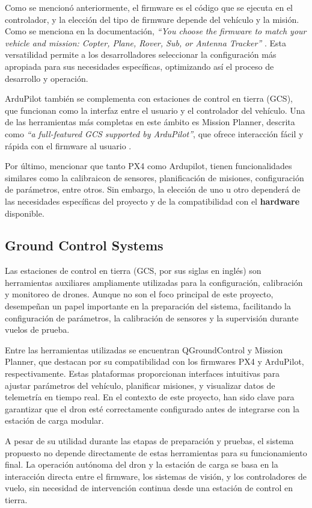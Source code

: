     Como se mencionó anteriormente, el firmware es el código que se ejecuta en el controlador, y la elección del tipo de firmware depende del vehículo y la misión. Como se menciona en la documentación, \textit{“You choose the firmware to match your vehicle and mission: Copter, Plane, Rover, Sub, or Antenna Tracker”} \cite{ardupilot_docs}. Esta versatilidad permite a los desarrolladores seleccionar la configuración más apropiada para sus necesidades específicas, optimizando así el proceso de desarrollo y operación.

    ArduPilot también se complementa con estaciones de control en tierra (GCS), que funcionan como la interfaz entre el usuario y el controlador del vehículo. Una de las herramientas más completas en este ámbito es Mission Planner, descrita como \textit{“a full-featured GCS supported by ArduPilot”}, que ofrece interacción fácil y rápida con el firmware al usuario \cite{ardupilot_docs}.


    Por último, mencionar que tanto PX4 como Ardupilot, tienen funcionalidades similares como la calibraicon de sensores, planificación de misiones, configuración de parámetros, entre otros. Sin embargo, la elección de uno u otro dependerá de las necesidades específicas del proyecto y de la compatibilidad con el \textbf{hardware} disponible.

\subsection{Ground Control Systems}

Las estaciones de control en tierra (GCS, por sus siglas en inglés) son herramientas auxiliares ampliamente utilizadas para la configuración, calibración y monitoreo de drones. Aunque no son el foco principal de este proyecto, desempeñan un papel importante en la preparación del sistema, facilitando la configuración de parámetros, la calibración de sensores y la supervisión durante vuelos de prueba.

Entre las herramientas utilizadas se encuentran QGroundControl y Mission Planner, que destacan por su compatibilidad con los firmwares PX4 y ArduPilot, respectivamente. Estas plataformas proporcionan interfaces intuitivas para ajustar parámetros del vehículo, planificar misiones, y visualizar datos de telemetría en tiempo real. En el contexto de este proyecto, han sido clave para garantizar que el dron esté correctamente configurado antes de integrarse con la estación de carga modular.

A pesar de su utilidad durante las etapas de preparación y pruebas, el sistema propuesto no depende directamente de estas herramientas para su funcionamiento final. La operación autónoma del dron y la estación de carga se basa en la interacción directa entre el firmware, los sistemas de visión, y los controladores de vuelo, sin necesidad de intervención continua desde una estación de control en tierra.

